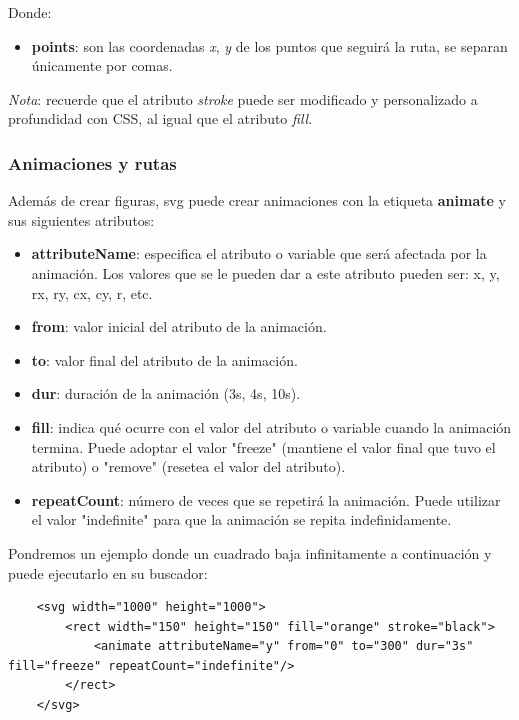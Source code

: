 Donde:
\begin{itemize}
    \item \textbf{points}: son las coordenadas \textit{x}, \textit{y} de los puntos que seguirá la ruta, se separan únicamente por comas.
\end{itemize}

\textit{Nota}: recuerde que el atributo \textit{stroke} puede ser modificado y personalizado a profundidad con CSS, al igual que el atributo \textit{fill}.


\subsubsection{Animaciones y rutas}
\hspace{0.55cm}Además de crear figuras, svg puede crear animaciones con la etiqueta \textbf{animate} y sus siguientes atributos:
\begin{itemize}
    \item \textbf{attributeName}: especifica el atributo o variable que será afectada por la animación. Los valores que se le pueden dar a este atributo pueden ser: x, y, rx, ry, cx, cy, r, etc.
    \item \textbf{from}: valor inicial del atributo de la animación.
    \item \textbf{to}: valor final del atributo de la animación.
    \item \textbf{dur}: duración de la animación (3s, 4s, 10s).
    \item \textbf{fill}: indica qué ocurre con el valor del atributo o variable cuando la animación termina. Puede adoptar el valor "freeze" (mantiene el valor final que tuvo el atributo) o "remove" (resetea el valor del atributo).
    \item \textbf{repeatCount}: número de veces que se repetirá la animación. Puede utilizar el valor "indefinite" para que la animación se repita indefinidamente.
\end{itemize}

Pondremos un ejemplo donde un cuadrado baja infinitamente a continuación y puede ejecutarlo en su buscador:
\begin{lstlisting}
    <svg width="1000" height="1000">
        <rect width="150" height="150" fill="orange" stroke="black">
            <animate attributeName="y" from="0" to="300" dur="3s" fill="freeze" repeatCount="indefinite"/> 
        </rect>
    </svg>
\end{lstlisting}

